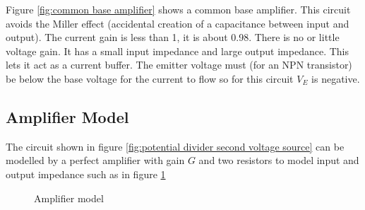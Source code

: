 \documentclass{article}
\begin{document}
    Figure \ref{fig:common base amplifier} shows a common base amplifier.
    This circuit avoids the Miller effect (accidental creation of a capacitance between input and output).
    The current gain is less than 1, it is about 0.98.
    There is no or little voltage gain.
    It has a small input impedance and large output impedance.
    This lets it act as a current buffer.
    The emitter voltage must (for an NPN transistor) be below the base voltage for the current to flow so for this circuit \(V_E\) is negative.
    
    \subsection{Amplifier Model}
    The circuit shown in figure \ref{fig:potential divider second voltage source} can be modelled by a perfect amplifier with gain \(G\) and two resistors to model input and output impedance such as in figure \ref{fig:amplifier model}
    
    \begin{figure}[ht]
        \centering
        \caption{Amplifier model}
        \label{fig:amplifier model}
    \end{figure}
    
\end{document}
